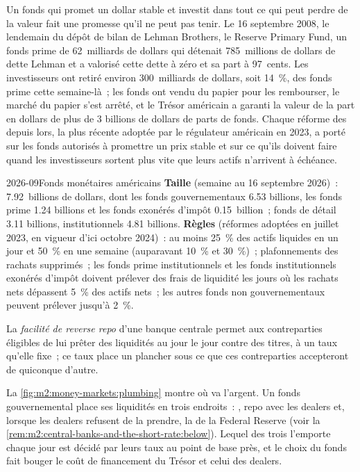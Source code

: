 Un fonds qui promet un dollar stable et investit dans tout ce qui peut perdre
de la valeur fait une promesse qu'il ne peut pas tenir. Le 16 septembre 2008, le lendemain
du dépôt de bilan de Lehman Brothers, le Reserve Primary Fund, un fonds prime de 62~milliards de dollars
qui détenait 785~millions de dollars de dette Lehman et a valorisé cette dette à zéro
et sa part à 97~cents. Les investisseurs ont retiré environ 300~milliards de dollars, soit 14~\%,
des fonds prime cette semaine-là~; les fonds ont vendu du papier pour les rembourser, le marché du papier
s'est arrêté, et le Trésor américain a garanti la valeur de la part en dollars de plus de 3
billions de dollars de parts de fonds. Chaque réforme des  depuis lors, la plus récente
adoptée par le régulateur américain en 2023, a porté sur les fonds autorisés à promettre un
prix stable et sur ce qu'ils doivent faire quand les investisseurs sortent plus vite que
leurs actifs n'arrivent à échéance.

\begin{dated}{2026-09}{Fonds monétaires américains}\label{dat:m2:money-markets:mmf}
\textbf{Taille} (semaine au 16 septembre 2026)~: 7.92~billions de dollars, dont
les fonds gouvernementaux 6.53 billions, les fonds prime 1.24 billions et les fonds exonérés d'impôt
0.15~billion~; fonds de détail 3.11 billions, institutionnels 4.81 billions.
\textbf{Règles} (réformes adoptées en juillet 2023, en vigueur d'ici octobre 2024)~: au moins
25~\% des actifs liquides en un jour et 50~\% en une semaine (auparavant 10~\% et
30~\%)~; plafonnements des rachats supprimés~; les fonds prime institutionnels et les
fonds institutionnels exonérés d'impôt doivent prélever des frais de liquidité les jours où les rachats nets
dépassent 5~\% des actifs nets~; les autres fonds non gouvernementaux peuvent prélever jusqu'à 2~\%.
\end{dated}

\begin{definition}\label{def:m2:money-markets:rrp}
La \emph{facilité de reverse repo} d'une banque centrale permet
aux contreparties éligibles de lui prêter des liquidités au jour le jour contre des titres, à un taux
qu'elle fixe~; ce taux place un plancher sous ce que ces contreparties
accepteront de quiconque d'autre.
\end{definition}

La \cref{fig:m2:money-markets:plumbing} montre où va l'argent. Un fonds gouvernemental
place ses liquidités en trois endroits~: , repo avec les dealers et, lorsque
les dealers refusent de la prendre, la  de la Federal Reserve
(voir la \cref{rem:m2:central-banks-and-the-short-rate:below}). Lequel des trois
l'emporte chaque jour est décidé par leurs taux au point de base près, et le choix
du fonds fait bouger le coût de financement du Trésor et celui des dealers.

